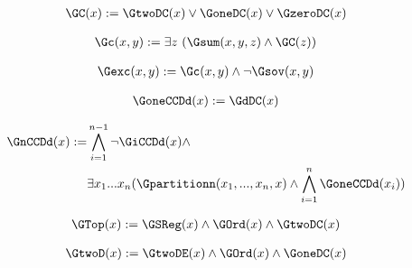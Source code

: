 \begin{erin}
    \begin{align*}
        \GC(x) := \GtwoDC(x) \vee \GoneDC(x) \vee \GzeroDC(x)
    \end{align*}
\end{erin}

\begin{erin}
    \begin{align*}
        \Gc(x,y) := \exists z\ (\Gsum(x,y,z) \wedge \GC(z))
    \end{align*}
\end{erin}

\begin{erin}
    \begin{align*}
        \Gexc(x,y) := \Gc(x,y) \wedge \neg\Gsov(x,y)
    \end{align*}
\end{erin}

\begin{erin}
    \begin{align*}
        \GoneCCDd(x) := \GdDC(x)
    \end{align*}
\end{erin}

\begin{erin}
    \begin{align*}
        \GnCCDd(x) := &\bigwedge_{i=1}^{n-1} \neg\GiCCDd(x) \wedge\\
                    &\exists x_{1}...x_{n}(\Gpartitionn(x_{1},...,x_{n},x)
                    \wedge \bigwedge_{i=1}^{n} \GoneCCDd(x_{i}))
    \end{align*}
\end{erin}

\begin{erin}
    \begin{align*}
        \GTop(x) := \GSReg(x) \wedge \GOrd(x) \wedge \GtwoDC(x)
    \end{align*}
\end{erin}

\begin{erin}
    \begin{align*}
        \GtwoD(x) := \GtwoDE(x) \wedge \GOrd(x) \wedge \GoneDC(x)
    \end{align*}
\end{erin}

